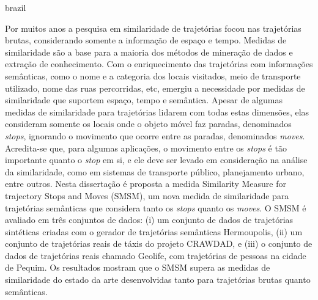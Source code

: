 \swapcontents
{
    \begin{otherlanguage*}{brazil}
    \begin{resumo}[Resumo]

        Por muitos anos a pesquisa em similaridade de trajetórias focou nas trajetórias brutas, considerando somente a informação de espaço e tempo. {Medidas de similaridade são a base para a maioria dos métodos de mineração de dados e extração de conhecimento. }Com o enriquecimento das trajetórias com informações semânticas, como o nome e a categoria dos locais visitados, meio de transporte utilizado, nome das ruas percorridas, etc, emergiu a necessidade por medidas de similaridade que suportem espaço, tempo e semântica. Apesar de algumas medidas de similaridade para trajetórias lidarem com todas estas dimensões, elas consideram somente os locais onde o objeto móvel faz paradas, denominados \emph{stops}, ignorando o movimento que ocorre entre as paradas, denominados \emph{moves}.
        Acredita-se que, para algumas aplicações, o movimento entre os \emph{stops} é tão importante quanto o \emph{stop} em si, e ele deve ser levado em consideração na análise da similaridade, como em sistemas de transporte público, planejamento urbano, entre outros.
        Nesta dissertação é proposta a medida Similarity Measure for trajectory Stops and Moves (SMSM), um nova medida de similaridade para trajetórias semânticas que considera tanto os \emph{stops} quanto os \emph{moves}.
        O SMSM é avaliado em três conjuntos de dados: (i) um conjunto de dados de trajetórias sintéticas criadas com o gerador de trajetórias semânticas Hermoupolis, (ii) um conjunto de trajetórias reais de táxis do projeto CRAWDAD, e (iii) o conjunto de dados de trajetórias reais chamado Geolife, com trajetórias de pessoas na cidade de Pequim. Os resultados mostram que o SMSM supera as medidas de similaridade do estado da arte desenvolvidas tanto para trajetórias brutas quanto semânticas.
        

    \end{resumo}
    \end{otherlanguage*}
}
